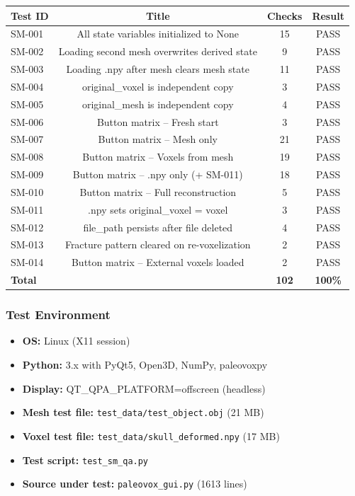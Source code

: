 \documentclass[12pt,a4paper]{article}
\begin{document}
\vspace{6pt}
\begin{tabular}{|l|c|c|c|}
\hline
\textbf{Test ID} & \textbf{Title} & \textbf{Checks} & \textbf{Result} \\
\hline
SM-001 & All state variables initialized to None & 15 & PASS \\
SM-002 & Loading second mesh overwrites derived state & 9 & PASS \\
SM-003 & Loading .npy after mesh clears mesh state & 11 & PASS \\
SM-004 & original\_voxel is independent copy & 3 & PASS \\
SM-005 & original\_mesh is independent copy & 4 & PASS \\
SM-006 & Button matrix -- Fresh start & 3 & PASS \\
SM-007 & Button matrix -- Mesh only & 21 & PASS \\
SM-008 & Button matrix -- Voxels from mesh & 19 & PASS \\
SM-009 & Button matrix -- .npy only (+ SM-011) & 18 & PASS \\
SM-010 & Button matrix -- Full reconstruction & 5 & PASS \\
SM-011 & .npy sets original\_voxel = voxel & 3 & PASS \\
SM-012 & file\_path persists after file deleted & 4 & PASS \\
SM-013 & Fracture pattern cleared on re-voxelization & 2 & PASS \\
SM-014 & Button matrix -- External voxels loaded & 2 & PASS \\
\hline
\textbf{Total} & & \textbf{102} & \textbf{100\%} \\
\hline
\end{tabular}

\newpage

\subsubsection{Test Environment}

\begin{itemize}
  \item \textbf{OS:} Linux (X11 session)
  \item \textbf{Python:} 3.x with PyQt5, Open3D, NumPy, paleovoxpy
  \item \textbf{Display:} QT\_QPA\_PLATFORM=offscreen (headless)
  \item \textbf{Mesh test file:} \texttt{test\_data/test\_object.obj} (21 MB)
  \item \textbf{Voxel test file:} \texttt{test\_data/skull\_deformed.npy} (17 MB)
  \item \textbf{Test script:} \texttt{test\_sm\_qa.py}
  \item \textbf{Source under test:} \texttt{paleovox\_gui.py} (1613 lines)
\end{itemize}
\end{document}
